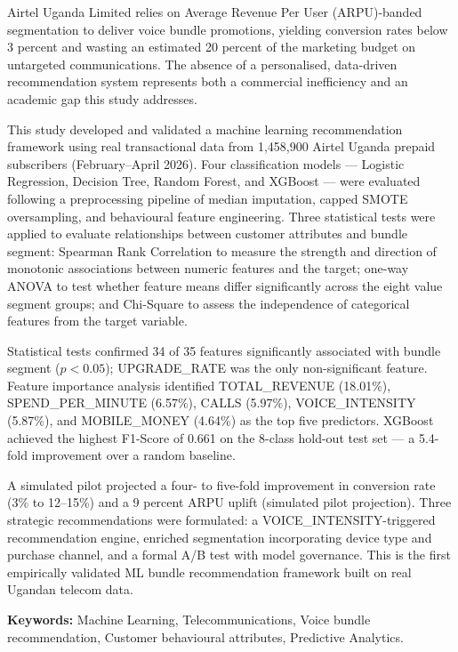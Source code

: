 Airtel Uganda Limited relies on Average Revenue Per User (ARPU)-banded segmentation to deliver voice bundle promotions, yielding conversion rates below 3 percent and wasting an estimated 20 percent of the marketing budget on untargeted communications. The absence of a personalised, data-driven recommendation system represents both a commercial inefficiency and an academic gap this study addresses.

This study developed and validated a machine learning recommendation framework using real transactional data from 1,458,900 Airtel Uganda prepaid subscribers (February--April 2026). Four classification models --- Logistic Regression, Decision Tree, Random Forest, and XGBoost --- were evaluated following a preprocessing pipeline of median imputation, capped SMOTE oversampling, and behavioural feature engineering. Three statistical tests were applied to evaluate relationships between customer attributes and bundle segment: Spearman Rank Correlation to measure the strength and direction of monotonic associations between numeric features and the target; one-way ANOVA to test whether feature means differ significantly across the eight value segment groups; and Chi-Square to assess the independence of categorical features from the target variable.

Statistical tests confirmed 34 of 35 features significantly associated with bundle segment ($p < 0.05$); UPGRADE\_RATE was the only non-significant feature. Feature importance analysis identified TOTAL\_REVENUE (18.01\%), SPEND\_PER\_MINUTE (6.57\%), CALLS (5.97\%), VOICE\_INTENSITY (5.87\%), and MOBILE\_MONEY (4.64\%) as the top five predictors. XGBoost achieved the highest F1-Score of 0.661 on the 8-class hold-out test set --- a 5.4-fold improvement over a random baseline.

A simulated pilot projected a four- to five-fold improvement in conversion rate (3\% to 12--15\%) and a 9 percent ARPU uplift (simulated pilot projection). Three strategic recommendations were formulated: a VOICE\_INTENSITY-triggered recommendation engine, enriched segmentation incorporating device type and purchase channel, and a formal A/B test with model governance. This is the first empirically validated ML bundle recommendation framework built on real Ugandan telecom data.

\textbf{Keywords:} Machine Learning, Telecommunications, Voice bundle recommendation, Customer behavioural attributes, Predictive Analytics.
